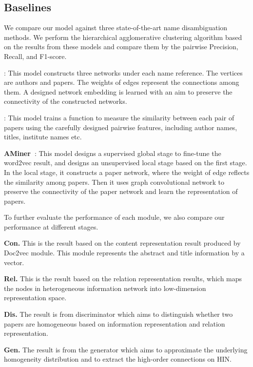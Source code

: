 \documentclass[letterpaper]{article}
\newcommand{\citet}[1]{{\citeauthor{#1} \shortcite{#1}}}
\begin{document}
\subsection{Baselines}
We compare our model against three state-of-the-art name disambiguation methods. We perform the hierarchical agglomerative clustering algorithm based on the results from these models and compare them by the pairwise Precision, Recall, and F1-score.

\textbf{\citet{Anonymized}}: This model constructs three networks under each name reference. The vertices are authors and papers. The weights of edges represent the connections among them. A designed network embedding is learned with an aim to preserve the connectivity of the constructed networks.

\textbf{\citet{Block}}: This model trains a function to measure the similarity between each pair of papers using the carefully designed pairwise features, including author names, titles, institute names etc.

\textbf{AMiner~\cite{JieTang}}: This model designs a supervised global stage to fine-tune the word2vec result, and designs an unsupervised local stage based on the first stage. In the local stage, it constructs a paper network, where the weight of edge reflects the similarity among papers. Then it uses graph convolutional network to preserve the connectivity of the paper network and learn the representation of papers.


To further evaluate the performance of each module, we also compare our performance at different stages.

\textbf{Con.} This is the result based on the content representation result produced by Doc2vec module. This module represents the abstract and title information by a vector.

\textbf{Rel.} This is the result based on the relation representation results, which maps the nodes in heterogeneous information network into low-dimension representation space.

\textbf{Dis.} The result is from discriminator which aims to distinguish whether two papers are homogeneous based on information representation and relation representation.

\textbf{Gen.} The result is from the generator which aims to approximate the underlying homogeneity distribution and to extract the high-order connections on HIN.
\end{document}
